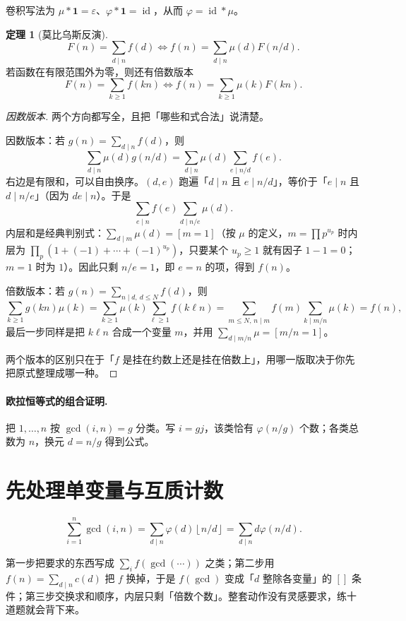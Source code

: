 \documentclass[UTF8,a4paper,11pt,twoside,openright,fontset=fandol]{ctexbook}
\theoremstyle{definition}
\newtheorem{theorem}[definition]{定理}
\newcommand{\eps}{\varepsilon}
\newcommand{\one}{\mathbf 1}
\newcommand{\id}{\operatorname{id}}
\newcommand{\floor}[1]{\left\lfloor #1\right\rfloor}
\newcommand{\iva}[1]{\left[#1\right]}
\begin{document}
卷积写法为 $\mu*\one=\eps$、$\varphi*\one=\id$，从而 $\varphi=\id*\mu$。
\begin{theorem}[莫比乌斯反演]
\[
 F(n)=\sum_{d\mid n}f(d)
 \iff f(n)=\sum_{d\mid n}\mu(d)F(n/d).
\]
若函数在有限范围外为零，则还有倍数版本
\[
 F(n)=\sum_{k\ge1}f(kn)
 \iff f(n)=\sum_{k\ge1}\mu(k)F(kn).
\]
\end{theorem}

\begin{proof}[因数版本]
两个方向都写全，且把「哪些和式合法」说清楚。

因数版本：若 $g(n)=\sum_{d\mid n}f(d)$，则
\[
 \sum_{d\mid n}\mu(d)g(n/d)
 =\sum_{d\mid n}\mu(d)\sum_{e\mid n/d}f(e).
\]
右边是有限和，可以自由换序。$(d,e)$ 跑遍「$d\mid n$ 且 $e\mid n/d$」，等价于「$e\mid n$ 且 $d\mid n/e$」（因为 $de\mid n$）。于是
\[
 \sum_{e\mid n}f(e)\sum_{d\mid n/e}\mu(d).
\]
内层和是经典判别式：$\sum_{d\mid m}\mu(d)=\iva{m=1}$（按 $\mu$ 的定义，$m=\prod p^{u_p}$ 时内层为 $\prod_p(1+(-1)+\cdots+(-1)^{u_p})$，只要某个 $u_p\ge1$ 就有因子 $1-1=0$；$m=1$ 时为 $1$）。因此只剩 $n/e=1$，即 $e=n$ 的项，得到 $f(n)$。

倍数版本：若 $g(n)=\sum_{n\mid d,\ d\le N}f(d)$，则
\[
 \sum_{k\ge1}g(kn)\mu(k)=\sum_{k\ge1}\mu(k)\sum_{\ell\ge1}f(k\ell n)
 =\sum_{m\le N,\,n\mid m}f(m)\!\!\sum_{k\mid m/n}\!\!\mu(k)=f(n),
\]
最后一步同样是把 $k\ell n$ 合成一个变量 $m$，并用 $\sum_{d\mid m/n}\mu=\iva{m/n=1}$。

两个版本的区别只在于「$f$ 是挂在约数上还是挂在倍数上」，用哪一版取决于你先把原式整理成哪一种。
\end{proof}
\paragraph{欧拉恒等式的组合证明.}
把 $1,\ldots,n$ 按 $\gcd(i,n)=g$ 分类。写 $i=gj$，该类恰有 $\varphi(n/g)$ 个数；各类总数为 $n$，换元 $d=n/g$ 得到公式。
\section{先处理单变量与互质计数}
\[
 \sum_{i=1}^n\gcd(i,n)
 =\sum_{d\mid n}\varphi(d)\floor{n/d}
 =\sum_{d\mid n}d\varphi(n/d).
\]

\begin{tip}
第一步把要求的东西写成 $\sum_{i}f(\gcd(\cdots))$ 之类；第二步用 $f(n)=\sum_{d\mid n}c(d)$ 把 $f$ 换掉，于是 $f(\gcd)$ 变成「$d$ 整除各变量」的 $\iva{}$ 条件；第三步交换求和顺序，内层只剩「倍数个数」。整套动作没有灵感要求，练十道题就会背下来。
\end{tip}
\end{document}
